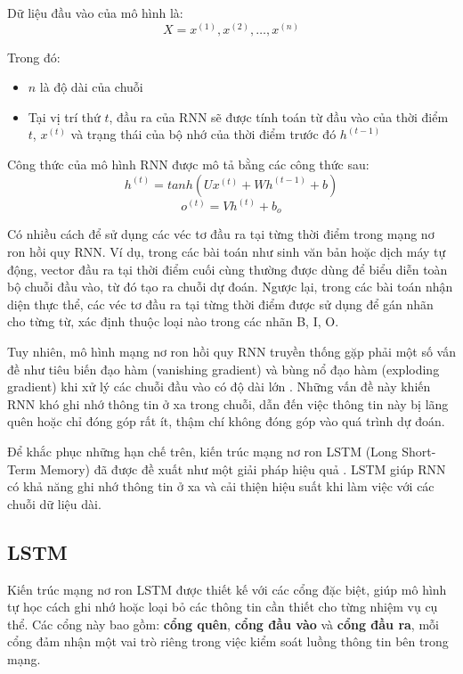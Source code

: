 Dữ liệu đầu vào của mô hình là:
\begin{equation}
    X = {x^{(1)}, x^{(2)}, \dots, x^{(n)}}    
\end{equation}

Trong đó:
\begin{itemize}
    \item $n$ là độ dài của chuỗi
    \item Tại vị trí thứ $t$, đầu ra của RNN sẽ được tính toán từ đầu vào của thời điểm $t$, $x^{(t)}$ và trạng thái của bộ nhớ của thời điểm trước đó $h^{(t-1)}$
\end{itemize}

Công thức của mô hình RNN được mô tả bằng các công thức sau:
\begin{equation}
    h^{(t)} = tanh(Ux^{(t)} + Wh^{(t-1)}+b)
\end{equation}
\begin{equation}
    o^{(t)} = Vh^{(t)}+b_{o}
\end{equation}

Có nhiều cách để sử dụng các véc tơ đầu ra tại từng thời điểm trong mạng nơ ron hồi quy RNN. Ví dụ, trong các bài toán như sinh văn bản hoặc dịch máy tự động, vector đầu ra tại thời điểm cuối cùng thường được dùng để biểu diễn toàn bộ chuỗi đầu vào, từ đó tạo ra chuỗi dự đoán. Ngược lại, trong các bài toán nhận diện thực thể, các véc tơ đầu ra tại từng thời điểm được sử dụng để gán nhãn cho từng từ, xác định thuộc loại nào trong các nhãn B, I, O.

Tuy nhiên, mô hình mạng nơ ron hồi quy RNN truyền thống gặp phải một số vấn đề như tiêu biến đạo hàm (vanishing gradient) và bùng nổ đạo hàm (exploding gradient) khi xử lý các chuỗi đầu vào có độ dài lớn \cite{bengio1994learning}. Những vấn đề này khiến RNN khó ghi nhớ thông tin ở xa trong chuỗi, dẫn đến việc thông tin này bị lãng quên hoặc chỉ đóng góp rất ít, thậm chí không đóng góp vào quá trình dự đoán.

Để khắc phục những hạn chế trên, kiến trúc mạng nơ ron LSTM (Long Short-Term Memory) đã được đề xuất như một giải pháp hiệu quả \cite{hochreiter1997lstm}. LSTM giúp RNN có khả năng ghi nhớ thông tin ở xa và cải thiện hiệu suất khi làm việc với các chuỗi dữ liệu dài.

\subsection{LSTM}
\label{subsec:lstm}
Kiến trúc mạng nơ ron LSTM được thiết kế với các cổng đặc biệt, giúp mô hình tự học cách ghi nhớ hoặc loại bỏ các thông tin cần thiết cho từng nhiệm vụ cụ thể. Các cổng này bao gồm: \textbf{cổng quên}, \textbf{cổng đầu vào} và \textbf{cổng đầu ra}, mỗi cổng đảm nhận một vai trò riêng trong việc kiểm soát luồng thông tin bên trong mạng.

